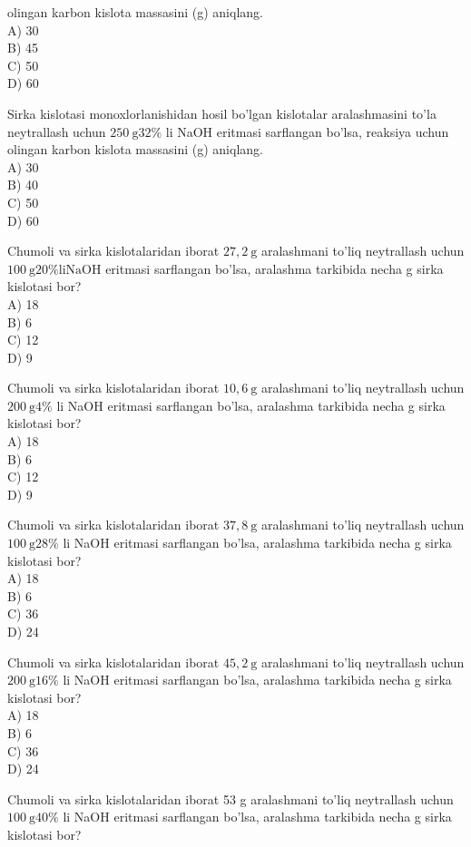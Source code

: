olingan karbon kislota massasini (g) aniqlang.\\
A) 30\\
B) 45\\
C) 50\\
D) 60
  \item Sirka kislotasi monoxlorlanishidan hosil bo'lgan kislotalar aralashmasini to'la neytrallash uchun $250 \mathrm{~g} 32 \%$ li NaOH eritmasi sarflangan bo'lsa, reaksiya uchun olingan karbon kislota massasini (g) aniqlang.\\
A) 30\\
B) 40\\
C) 50\\
D) 60
  \item Chumoli va sirka kislotalaridan iborat $27,2 \mathrm{~g}$ aralashmani to'liq neytrallash uchun $100 \mathrm{~g} 20 \% \mathrm{li} \mathrm{NaOH}$ eritmasi sarflangan bo'lsa, aralashma tarkibida necha g sirka kislotasi bor?\\
A) 18\\
B) 6\\
C) 12\\
D) 9
  \item Chumoli va sirka kislotalaridan iborat $10,6 \mathrm{~g}$ aralashmani to'liq neytrallash uchun $200 \mathrm{~g} 4 \%$ li NaOH eritmasi sarflangan bo'lsa, aralashma tarkibida necha g sirka kislotasi bor?\\
A) 18\\
B) 6\\
C) 12\\
D) 9
  \item Chumoli va sirka kislotalaridan iborat $37,8 \mathrm{~g}$ aralashmani to'liq neytrallash uchun $100 \mathrm{~g} 28 \%$ li NaOH eritmasi sarflangan bo'lsa, aralashma tarkibida necha g sirka kislotasi bor?\\
A) 18\\
B) 6\\
C) 36\\
D) 24
  \item Chumoli va sirka kislotalaridan iborat $45,2 \mathrm{~g}$ aralashmani to'liq neytrallash uchun $200 \mathrm{~g} 16 \%$ li NaOH eritmasi sarflangan bo'lsa, aralashma tarkibida necha g sirka kislotasi bor?\\
A) 18\\
B) 6\\
C) 36\\
D) 24
  \item Chumoli va sirka kislotalaridan iborat 53 g aralashmani to'liq neytrallash uchun $100 \mathrm{~g} 40 \%$ li NaOH eritmasi sarflangan bo'lsa, aralashma tarkibida necha g sirka kislotasi bor?\\
